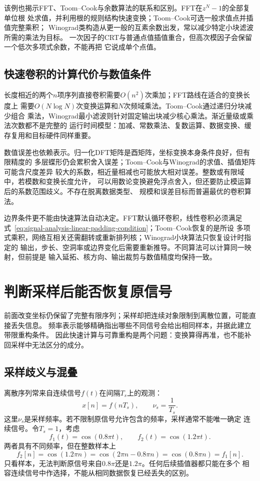 该例也揭示FFT、Toom--Cook与余数算法的联系和区别。FFT在$z^N-1$的全部复单位根
处求值，并利用根的规则结构快速变换；Toom--Cook可选一般求值点并插值完整乘积；
Winograd类构造从更一般的互素余数出发，常以减少特定小块滤波所需的乘法为目标。
一次因子的CRT与普通点值插值重合，但高次模因子会保留一个低次多项式余数，不能再把
它说成单个点值。

\subsection{快速卷积的计算代价与数值条件}

长度相近的两个$n$项序列直接卷积需要$O(n^2)$次乘加；FFT路线在适合的变换长度上
需要$O(N\log N)$次变换运算和$N$次频域乘法。Toom--Cook通过递归分块减少组合
乘法，Winograd最小滤波则针对固定输出块减少核心乘法。渐近量级或乘法次数都不是完整的
运行时间模型：加减、常数乘法、复数运算、数据变换、缓存复用和目标硬件同样重要。

数值误差也依赖表示。归一化DFT矩阵是酉矩阵，坐标变换本身条件良好，但有限精度的
多层蝶形仍会累积舍入误差；Toom--Cook与Winograd的求值、插值矩阵可能含尺度差异
较大的系数，相近量相减也可能放大相对误差。整数或有限域中，若模数和变换长度允许，
可以用数论变换避免浮点舍入，但还要防止模运算后的系数范围歧义。不存在脱离数据类型、
规模和误差目标而普遍最优的卷积算法。

边界条件更不能由快速算法自动决定。FFT默认循环卷积，线性卷积必须满足
式~\eqref{eq:signal-analysis-linear-padding-condition}；Toom--Cook恢复的是所设
多项式乘积，网络互相关还需翻转或重新排列核；Winograd小块算法只恢复设计时指定的
输出，步长、空洞率或边界变化后需要重新推导。不同算法可以计算同一映射，但前提是
输入延拓、核方向、输出裁剪与数值精度均保持一致。

\section{判断采样后能否恢复原信号}
\label{sec:signal-analysis-sampling}

前面改变坐标仍保留了完整有限序列；采样却把连续对象限制到离散位置，可能直接丢失信息。
频率表示能够精确指出哪些不同信号会给出相同样本，并据此建立带限重构条件。
因此快速计算与可靠重构是两个问题：变换算得再准，也不能补回采样中无法区分的成分。

\subsection{采样歧义与混叠}

离散序列常来自连续信号$f(t)$在间隔$T_s$上的观测：
\[
  x[n]=f(nT_s),\qquad \nu_s=\frac{1}{T_s}.
\]
这里$\nu_s$是采样频率。若不限制原信号允许包含的频率，采样通常不能唯一确定
连续信号。令$T_s=1$，考虑
\[
  f_1(t)=\cos(0.8\pi t),\qquad
  f_2(t)=\cos(1.2\pi t).
\]
两者具有不同频率，但在整数样本上
\[
  f_2[n]
  =
  \cos(1.2\pi n)
  =
  \cos(2\pi n-0.8\pi n)
  =
  \cos(0.8\pi n)
  =
  f_1[n].
\]
只看样本，无法判断原信号来自$0.8\pi$还是$1.2\pi$。任何后续插值器都只能在多个
相容连续信号中作选择，不能从相同数据恢复已经丢失的区别。

